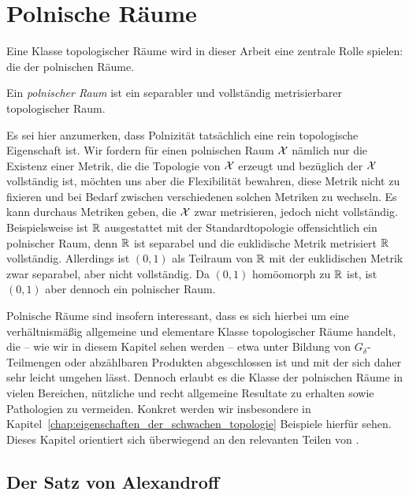 \documentclass[../thesis/thesis.tex]{subfiles}
\begin{document}
	
	\chapter{Polnische Räume}
	\label{chap:polnische_räume}
	
	Eine Klasse topologischer Räume wird in dieser Arbeit eine zentrale Rolle spielen: die der polnischen Räume.
	
	\begin{Definition}
		Ein \emph{polnischer Raum} ist ein separabler und vollständig metrisierbarer topologischer Raum.
	\end{Definition}

	\begin{Bemerkung}
		Es sei hier anzumerken, dass Polnizität tatsächlich eine rein topologische Eigenschaft ist. Wir fordern für einen polnischen Raum $\mathcal{X}$ nämlich nur die Existenz einer Metrik,
		die die Topologie von $\mathcal{X}$ erzeugt und bezüglich der $\mathcal{X}$ vollständig ist, möchten uns aber die Flexibilität
		bewahren, diese Metrik nicht zu fixieren und bei Bedarf zwischen verschiedenen solchen Metriken
		zu wechseln. Es kann durchaus Metriken geben, die $\mathcal{X}$ zwar metrisieren, jedoch nicht vollständig.
		Beispielsweise ist $\mathbb{R}$ ausgestattet mit der Standardtopologie offensichtlich ein polnischer Raum,
		denn $\mathbb{R}$ ist separabel und die euklidische Metrik metrisiert $\mathbb{R}$ vollständig. 
		Allerdings ist $(0, 1)$ als Teilraum von $\mathbb{R}$ mit der euklidischen Metrik zwar separabel, aber nicht vollständig.
		Da $(0, 1)$ homöomorph zu $\mathbb{R}$ ist, ist $(0, 1)$ aber dennoch ein polnischer Raum.
	\end{Bemerkung}

	Polnische Räume sind insofern interessant, dass es sich hierbei um eine verhältnismäßig allgemeine und elementare Klasse topologischer Räume handelt, die -- wie wir in diesem Kapitel sehen werden -- 
	etwa unter Bildung von $G_\delta$-Teilmengen oder abzählbaren Produkten abgeschlossen ist und mit der sich daher sehr leicht umgehen lässt. Dennoch erlaubt es die Klasse der polnischen Räume in vielen Bereichen, 
	nützliche und recht allgemeine Resultate zu erhalten sowie Pathologien zu vermeiden. Konkret werden wir insbesondere in Kapitel~\ref{chap:eigenschaften_der_schwachen_topologie} Beispiele hierfür sehen.
	Dieses Kapitel orientiert sich überwiegend an den relevanten Teilen von \cite[Section 4.14]{Simon.2015}. 
	
	\section{Der Satz von Alexandroff}
	
\end{document}
